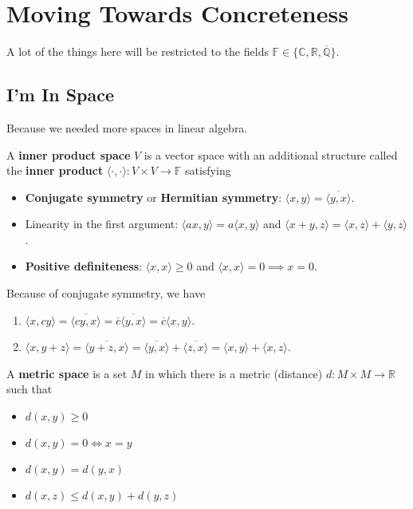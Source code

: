 \section{Moving Towards Concreteness}
A lot of the things here will be restricted to the fields $\mathbb{F}
\in \lbrace \mathbb{C}, \mathbb{R}, \overline{\mathbb{Q}} \rbrace $.

\subsection{I'm In Space}
Because we needed more spaces in linear algebra.

\begin{df}
A \textbf{inner product space} $V$ is a vector space with an additional
structure called the \textbf{inner product} $\langle \cdot, \cdot
\rangle : V \times V \rightarrow \mathbb{F}$ satisfying
\begin{itemize}
\item \textbf{Conjugate symmetry} or \textbf{Hermitian symmetry}:
$\langle x, y \rangle = \overline{\langle y, x \rangle}$.
\item Linearity in the first argument: $\langle ax, y \rangle = a
\langle x, y \rangle$ and $\langle x + y, z \rangle = \langle x, z
\rangle + \langle y, z \rangle$.
\item \textbf{Positive definiteness}: $\langle x, x \rangle \geq 0$ and
$\langle x, x \rangle = 0 \implies x = 0$.
\end{itemize}
\end{df}

\begin{rem}
Because of conjugate symmetry, we have
\begin{enumerate}
\item $\langle x, cy \rangle = \overline{\langle cy, x \rangle} =
\overline{c} \overline{\langle y, x \rangle} = \overline{c} \langle x, y
\rangle$.
\item $\langle x, y + z \rangle = \overline{\langle y + z, x \rangle} =
\overline{\langle y, x \rangle} + \overline{\langle z, x \rangle} =
\langle x, y \rangle + \langle x, z \rangle$.
\end{enumerate}
\end{rem}

\begin{df}
A \textbf{metric space} is a set $M$ in which there is a metric
(distance) $d : M \times M \rightarrow \mathbb{R}$ such that
\begin{itemize}
\item $d(x, y) \geq 0$
\item $d(x, y) = 0 \Leftrightarrow x = y$
\item $d(x, y) = d(y, x)$
\item $d(x, z) \leq d(x, y) + d(y, z)$
\end{itemize}
\end{df}

